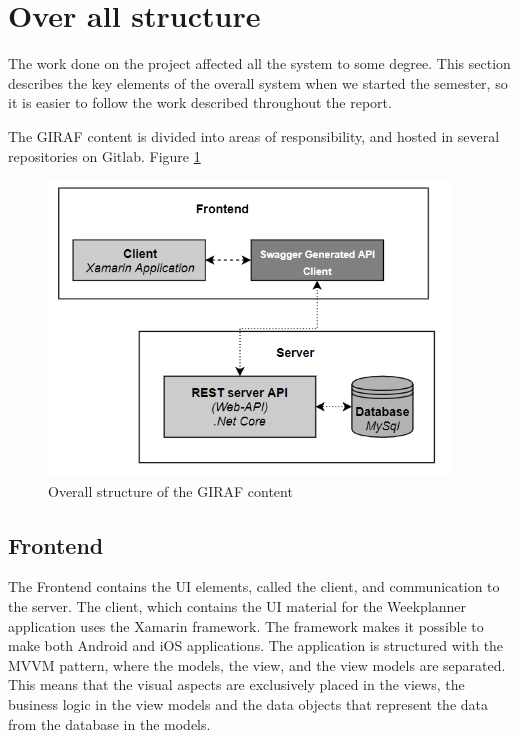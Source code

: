 \section{Over all structure}

The work done on the project affected all the system to some degree. This section describes the key elements of the overall system when we started the semester, so it is easier to follow the work described throughout the report. 

The GIRAF content is divided into areas of responsibility, and hosted in several repositories on Gitlab. Figure \ref{fig:ProductStructure}

\begin{figure}[H]
    \begin{center}
        \includegraphics[width=0.95\textwidth]{figures/ProductStructure.png}
    \end{center}
    \caption{Overall structure of the GIRAF content}
    \label{fig:ProductStructure}
\end{figure}

\subsection{Frontend}
The Frontend contains the UI elements, called the client, and communication to the server. The client, which contains the UI material for the Weekplanner application uses the Xamarin framework. The framework makes it possible to make both Android and iOS applications. The application is structured with the MVVM pattern, where the models, the view, and the view models are separated. This means that the visual aspects are exclusively placed in the views, the business logic in the view models and the data objects that represent the data from the database in the models.

